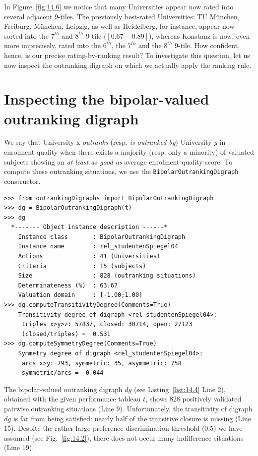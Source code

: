 In Figure~\vref{fig:14.6} we notice that many Universities appear now rated into several adjacent 9-tiles. The previously best-rated Universities: TU München, Freiburg, München, Leipzig, as well as  Heidelberg, for instance, appear now sorted into the $7^{th}$ and $8^{th}$ 9-tile ($[0.67 - 0.89]$), whereas Konstanz is now, even more imprecisely, rated into the $6^{th}$, the $7^{th}$ and the $8^{th}$ 9-tile.
How confident, hence, is our precise \Copeland rating-by-ranking result? To investigate this question, let us now inspect the outranking digraph on which we actually apply the \Copeland ranking rule.

\section{Inspecting the bipolar-valued outranking digraph}
\label{sec:14.2}

We say that University x \emph{outranks} (resp. \emph{is outranked by}) University $y$ in enrolment quality when there exists a majority (resp. only a minority) of valuated subjects showing an \emph{at least as good as} average enrolment quality score. To compute these outranking situations, we use the \texttt{BipolarOutrankingDigraph} constructor.
\begin{lstlisting}[caption={Computing 9-tiles of the enrolment quality scores per subject},label=list:14.4]
>>> from outrankingDigraphs import BipolarOutrankingDigraph
>>> dg = BipolarOutrankingDigraph(t) 
>>> dg
  *------- Object instance description ------*
    Instance class       : BipolarOutrankingDigraph
    Instance name        : rel_studentenSpiegel04
    Actions              : 41 (Universities)
    Criteria             : 15 (subjects)
    Size                 : 828 (outranking situations)
    Determinateness (%)  : 63.67
    Valuation domain     : [-1.00;1.00]
>>> dg.computeTransitivityDegree(Comments=True)
    Transitivity degree of digraph <rel_studentenSpiegel04>:
     triples x>y>z: 57837, closed: 30714, open: 27123
     (closed/triples) =  0.531
>>> dg.computeSymmetryDegree(Comments=True)
    Symmetry degree of digraph <rel_studentenSpiegel04>:
     arcs x>y: 793, symmetric: 35, asymmetric: 758
     symmetric/arcs =  0.044
\end{lstlisting}

The bipolar-valued outranking digraph $dg$ (see Listing~\vref{list:14.4} Line 2), obtained with the given performance tableau $t$, shows 828 positively validated pairwise outranking situations (Line 9). Unfortunately, the transitivity of digraph $dg$ is far from being satisfied: nearly half of the transitive closure is missing (Line 15). Despite the rather large preference discrimination threshold (0.5) we have assumed (see Fig.~\vref{fig:14.2}), there does not occur many indifference situations (Line 19).

